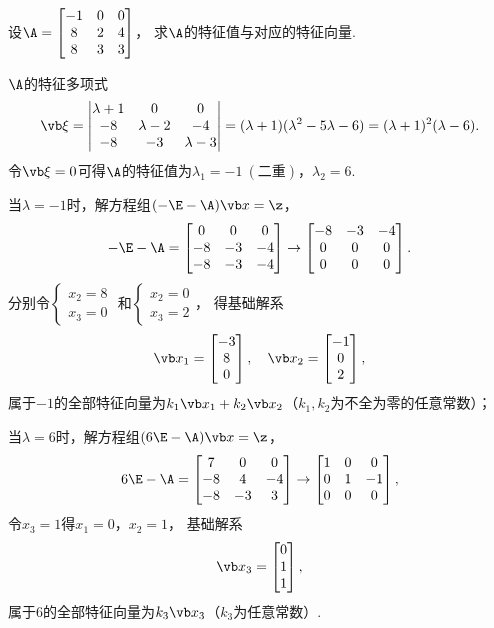 \begin{example}
设\(\A = \begin{bmatrix} -1 & 0 & 0 \\ 8 & 2 & 4 \\ 8 & 3 & 3 \end{bmatrix}\)，
求\(\A\)的特征值与对应的特征向量.
\begin{solution}
\(\A\)的特征多项式\[
	\a = \begin{vmatrix}
		\lambda+1 & 0 & 0 \\
		-8 & \lambda-2 & -4 \\
		-8 & -3 & \lambda-3
	\end{vmatrix}
	= (\lambda+1)(\lambda^2-5\lambda-6)
	= (\lambda+1)^2(\lambda-6).
\]
令\(\a = 0\)可得\(\A\)的特征值为\(\lambda_1=-1\ (\text{二重})\)，\(\lambda_2=6\).

当\(\lambda=-1\)时，解方程组\((-\E-\A)\x=\z\)，\[
	-\E-\A
	= \begin{bmatrix} 0 & 0 & 0 \\ -8 & -3 & -4 \\ -8 & -3 & -4 \end{bmatrix}
	\to \begin{bmatrix} -8 & -3 & -4 \\ 0 & 0 & 0 \\ 0 & 0 & 0 \end{bmatrix}.
\]
分别令\(\left\{ \begin{array}{l} x_2=8 \\ x_3=0 \end{array} \right.\)
和\(\left\{ \begin{array}{l} x_2=0 \\ x_3=2 \end{array} \right.\)，
得基础解系\[
	\x_1 = \begin{bmatrix} -3 \\ 8 \\ 0 \end{bmatrix},
	\quad
	\x_2 = \begin{bmatrix} -1 \\ 0 \\ 2 \end{bmatrix},
\]
属于\(-1\)的全部特征向量为\(k_1\x_1+k_2\x_2\)（\(k_1,k_2\)为不全为零的任意常数）；

当\(\lambda=6\)时，解方程组\((6\E-\A)\x=\z\)，\[
	6\E-\A
	= \begin{bmatrix} 7 & 0 & 0 \\ -8 & 4 & -4 \\ -8 & -3 & 3 \end{bmatrix}
	\to \begin{bmatrix} 1 & 0 & 0 \\ 0 & 1 & -1 \\ 0 & 0 & 0 \end{bmatrix},
\]
令\(x_3=1\)得\(x_1=0\)，\(x_2=1\)，
基础解系\[
	\x_3 = \begin{bmatrix} 0 \\ 1 \\ 1 \end{bmatrix},
\]
属于\(6\)的全部特征向量为\(k_3\x_3\)（\(k_3\)为任意常数）.
\end{solution}
\end{example}

